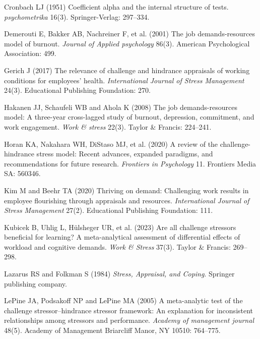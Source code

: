 \documentclass[
  man]{apa7}
\newlength{\cslhangindent}
\newlength{\cslentryspacingunit} %
\newenvironment{CSLReferences}[2] %
 {%
  \setlength{\parindent}{0pt}
  \ifodd #1
  \let\oldpar\par
  \def\par{\hangindent=\cslhangindent\oldpar}
  \fi
  \setlength{\parskip}{#2\cslentryspacingunit}
 }%
 {}
\begin{document}
\begin{CSLReferences}{1}{0}
\leavevmode{}%
Cronbach LJ (1951) Coefficient alpha and the internal structure of tests. \emph{psychometrika} 16(3). Springer-Verlag: 297--334.

\leavevmode{}%
Demerouti E, Bakker AB, Nachreiner F, et al. (2001) The job demands-resources model of burnout. \emph{Journal of Applied psychology} 86(3). American Psychological Association: 499.

\leavevmode{}%
Gerich J (2017) The relevance of challenge and hindrance appraisals of working conditions for employees' health. \emph{International Journal of Stress Management} 24(3). Educational Publishing Foundation: 270.

\leavevmode{}%
Hakanen JJ, Schaufeli WB and Ahola K (2008) The job demands-resources model: A three-year cross-lagged study of burnout, depression, commitment, and work engagement. \emph{Work \& stress} 22(3). Taylor \& Francis: 224--241.

\leavevmode{}%
Horan KA, Nakahara WH, DiStaso MJ, et al. (2020) A review of the challenge-hindrance stress model: Recent advances, expanded paradigms, and recommendations for future research. \emph{Frontiers in Psychology} 11. Frontiers Media SA: 560346.

\leavevmode{}%
Kim M and Beehr TA (2020) Thriving on demand: Challenging work results in employee flourishing through appraisals and resources. \emph{International Journal of Stress Management} 27(2). Educational Publishing Foundation: 111.

\leavevmode{}%
Kubicek B, Uhlig L, Hülsheger UR, et al. (2023) Are all challenge stressors beneficial for learning? A meta-analytical assessment of differential effects of workload and cognitive demands. \emph{Work \& Stress} 37(3). Taylor \& Francis: 269--298.

\leavevmode{}%
Lazarus RS and Folkman S (1984) \emph{Stress, Appraisal, and Coping}. Springer publishing company.

\leavevmode{}%
LePine JA, Podsakoff NP and LePine MA (2005) A meta-analytic test of the challenge stressor--hindrance stressor framework: An explanation for inconsistent relationships among stressors and performance. \emph{Academy of management journal} 48(5). Academy of Management Briarcliff Manor, NY 10510: 764--775.


\end{CSLReferences}
\end{document}
